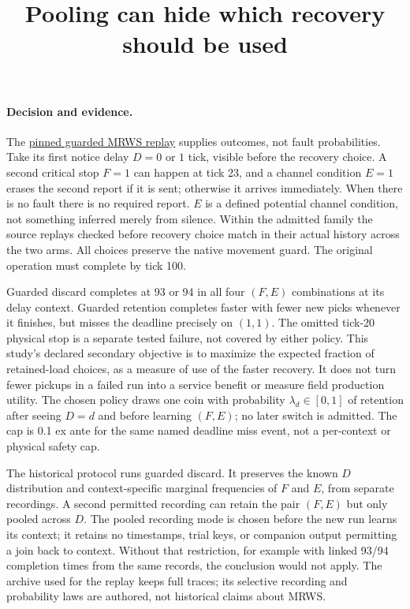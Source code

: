 \documentclass[11pt]{article}
\title{Pooling can hide which recovery should be used}
\date{}
\begin{document}
\maketitle

\paragraph{Decision and evidence.}
The \href{https://github.com/eternal-november/eos-research-programmes/pull/417}{pinned guarded MRWS replay} supplies outcomes, not fault probabilities. Take its first notice delay $D=0$ or $1$ tick, visible before the recovery choice. A second critical stop $F=1$ can happen at tick 23, and a channel condition $E=1$ erases the second report if it is sent; otherwise it arrives immediately. When there is no fault there is no required report. $E$ is a defined potential channel condition, not something inferred merely from silence. Within the admitted family the source replays checked before recovery choice match in their actual history across the two arms. All choices preserve the native movement guard. The original operation must complete by tick 100.

Guarded discard completes at 93 or 94 in all four $(F,E)$ combinations at its delay context. Guarded retention completes faster with fewer new picks whenever it finishes, but misses the deadline precisely on $(1,1)$. The omitted tick-20 physical stop is a separate tested failure, not covered by either policy. This study's declared secondary objective is to maximize the expected fraction of retained-load choices, as a measure of use of the faster recovery. It does not turn fewer pickups in a failed run into a service benefit or measure field production utility. The chosen policy draws one coin with probability $\lambda_d\in[0,1]$ of retention after seeing $D=d$ and before learning $(F,E)$; no later switch is admitted. The cap is 0.1 ex ante for the same named deadline miss event, not a per-context or physical safety cap.

The historical protocol runs guarded discard. It preserves the known $D$ distribution and context-specific marginal frequencies of $F$ and $E$, from separate recordings. A second permitted recording can retain the pair $(F,E)$ but only pooled across $D$. The pooled recording mode is chosen before the new run learns its context; it retains no timestamps, trial keys, or companion output permitting a join back to context. Without that restriction, for example with linked 93/94 completion times from the same records, the conclusion would not apply. The archive used for the replay keeps full traces; its selective recording and probability laws are authored, not historical claims about MRWS.
\end{document}

